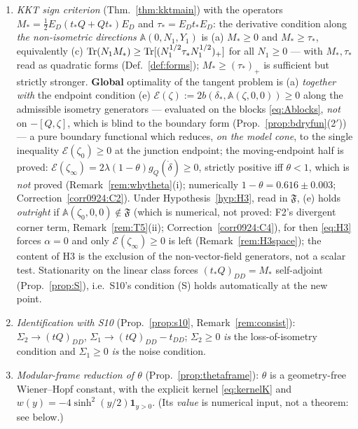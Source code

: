 \documentclass[11pt]{article}
\newcommand{\Aop}{\mathbb A}
\begin{document}
\begin{enumerate}[leftmargin=1.8em,itemsep=1pt]
 brief's question is: the boundary directions do not enlarge the \emph{value} through
 $N_1$, but they do form a genuine extra one-sided cone, which is why the criterion needs
 condition (e).
\item \emph{KKT sign criterion} (Thm.~\ref{thm:kktmain}) with the operators
 $M_*=\frac12E_D(t_*Q+Qt_*)E_D$ and $\tau_*=E_Dt_*E_D$:
 the derivative condition along \emph{the non-isometric directions} $\Aop(0,N_1,Y_1)$ is
 (a) $M_*\ge0$ and $M_*\ge\tau_*$, equivalently (c)
 $\operatorname{Tr}(N_1M_*)\ge\operatorname{Tr}[(N_1^{1/2}\tau_*N_1^{1/2})_+]$ for all $N_1\ge0$ --- with $M_*,\tau_*$
 read as quadratic forms (Def.~\ref{def:forms}); $M_*\ge(\tau_*)_+$ is sufficient but
 strictly stronger.  \textbf{Global} optimality of the tangent problem is (a)
 \emph{together with} the endpoint condition (e)
 $\mathcal E(\zeta):=2b(\delta_*,\Aop(\zeta,0,0))\ge0$ along the admissible isometry
 generators --- evaluated on the blocks \eqref{eq:Ablocks}, \emph{not} on $-[Q,\zeta]$,
 which is blind to the boundary form (Prop.~\ref{prop:bdryfun}(2$'$)) --- a pure boundary
 functional which reduces, \emph{on the model cone}, to the single inequality
 $\mathcal E(\zeta_0)\ge0$ at the junction endpoint; the moving-endpoint half is proved:
 $\mathcal E(\zeta_\infty)=2\lambda(1-\theta)g_Q(\dot\delta)\ge0$, strictly positive iff $\theta<1$, which is \emph{not} proved (Remark~\ref{rem:whytheta}(i); numerically $1-\theta=0.616\pm0.003$; Correction~\ref{corr0924:C2}).  Under
 Hypothesis~\ref{hyp:H3}, read in $\mathfrak F$, (e) holds \emph{outright} if
 $\Aop(\zeta_0,0,0)\notin\mathfrak F$ (which is numerical, not proved: F2's divergent corner term, Remark~\ref{rem:T5}(ii); Correction~\ref{corr0924:C4}), for then \eqref{eq:H3} forces $\alpha=0$ and only
 $\mathcal E(\zeta_\infty)\ge0$ is left (Remark~\ref{rem:H3space}); the content of H3 is the
 exclusion of the non-vector-field generators, not a scalar test.  Stationarity on
 the linear class forces $(t_*Q)_{DD}=M_*$ self-adjoint (Prop.~\ref{prop:S}), i.e.\ S10's
 condition {\rm(S)} holds automatically at the new point.
\item \emph{Identification with S10} (Prop.~\ref{prop:s10}, Remark~\ref{rem:consist}):
 $\Sigma_2\to(tQ)_{DD}$, $\Sigma_1\to(tQ)_{DD}-t_{DD}$; $\Sigma_2\ge0$ \emph{is} the
 loss-of-isometry condition and $\Sigma_1\ge0$ \emph{is} the noise condition.
\item \emph{Modular-frame reduction of $\theta$} (Prop.~\ref{prop:thetaframe}): $\theta$ is
 a geometry-free Wiener--Hopf constant, with the explicit kernel \eqref{eq:kernelK} and
 $w(y)=-4\sinh^2(y/2)\mathbf 1_{y>0}$.  (Its \emph{value} is numerical input, not a
 theorem: see below.)
\end{enumerate}
\end{document}
